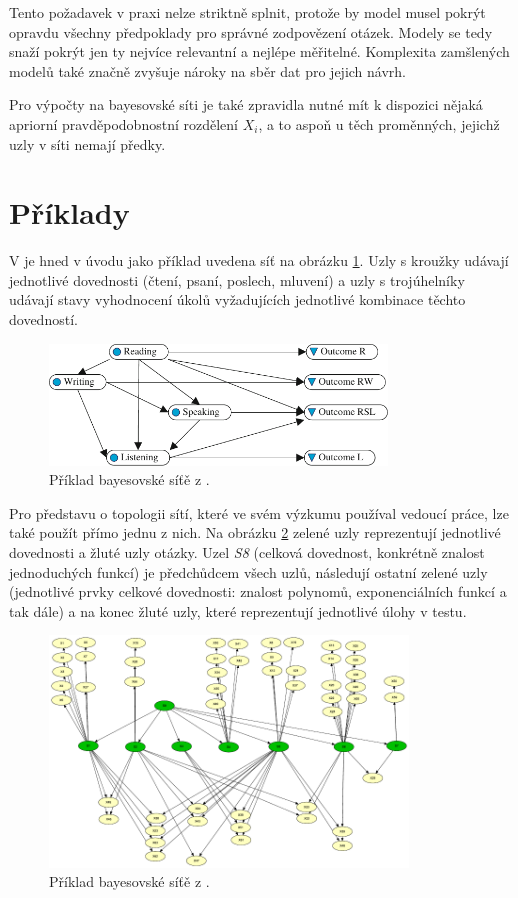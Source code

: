 \documentclass[a4paper,twoside,12pt]{book}
\begin{document}
Tento požadavek v praxi nelze striktně splnit, protože by model musel pokrýt opravdu všechny předpoklady pro správné zodpovězení otázek. Modely se tedy snaží pokrýt jen ty nejvíce relevantní a nejlépe měřitelné. Komplexita zamšlených modelů také značně zvyšuje nároky na sběr dat pro jejich návrh.

Pro výpočty na bayesovské síti je také zpravidla nutné mít k dispozici nějaká apriorní pravděpodobnostní rozdělení $X_i$, a to aspoň u těch proměnných, jejichž uzly v síti nemají předky.

\section{Příklady}
\label{sec:net_examples}
V \cite{almond_tlustospis} je hned v úvodu jako příklad uvedena síť na obrázku \ref{fig:almond_BN_example}. Uzly s kroužky udávají jednotlivé dovednosti (čtení, psaní, poslech, mluvení) a uzly s trojúhelníky udávají stavy vyhodnocení úkolů vyžadujících jednotlivé kombinace těchto dovedností.

\begin{figure}
  \centering
    \includegraphics[width=0.8\textwidth]{almond_BN_example.pdf}
  \caption{Příklad bayesovské síťě z \cite{almond_tlustospis}.}
  \label{fig:almond_BN_example}
\end{figure}

Pro představu o topologii sítí, které ve svém výzkumu používal vedoucí práce, lze také použít přímo jednu z nich. Na obrázku \ref{fig:plajner16} zelené uzly reprezentují jednotlivé dovednosti a žluté uzly otázky. Uzel \emph{S8} (celková dovednost, konkrétně znalost jednoduchých funkcí) je předchůdcem všech uzlů, následují ostatní zelené uzly (jednotlivé prvky celkové dovednosti: znalost polynomů, exponenciálních funkcí a tak dále) a na konec žluté uzly, které reprezentují jednotlivé úlohy v testu.

\begin{figure}
  \centering
    \includegraphics[width=0.85\textwidth]{complex_BN_plajner16.pdf}
  \caption{Příklad bayesovské síťě z \cite{plajner16}.}
  \label{fig:plajner16}
\end{figure}
\end{document}
